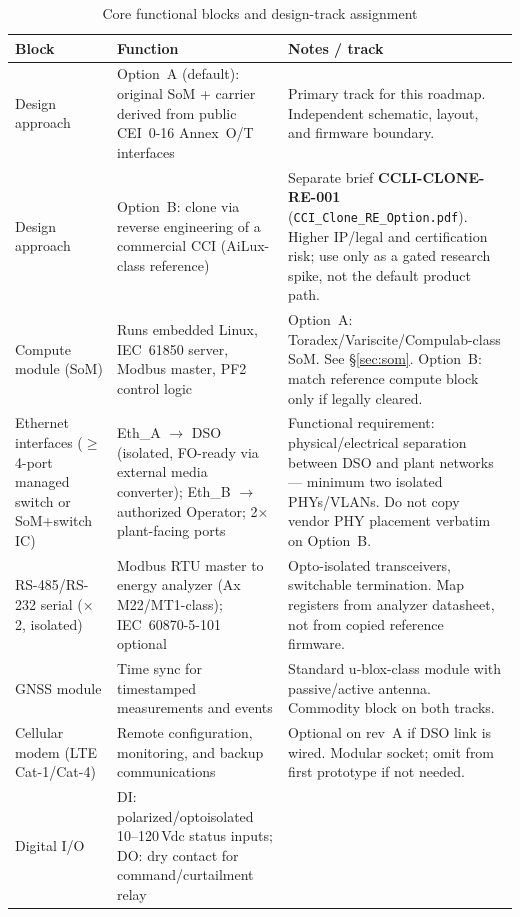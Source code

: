 \documentclass[11pt,a4paper]{article}
\newcommand{\file}[1]{\texttt{#1}}
\newcommand{\docref}[1]{\textbf{#1}}
\begin{document}
\begin{table}[htbp]
\centering
\caption{Core functional blocks and design-track assignment}
\label{tab:core-blocks}
\renewcommand{\arraystretch}{1.15}
\small
\begin{tabularx}{\linewidth}{@{}>{\raggedright\arraybackslash}p{2.65cm}>{\raggedright\arraybackslash}p{5.4cm}>{\RaggedRight\arraybackslash}X@{}}
\toprule
\textbf{Block} & \textbf{Function} & \textbf{Notes / track} \\
\midrule
Design approach &
Option~A (default): original SoM + carrier derived from public CEI~0-16 Annex~O/T interfaces &
Primary track for this roadmap. Independent schematic, layout, and firmware boundary. \\
\addlinespace
Design approach &
Option~B: clone via reverse engineering of a commercial CCI (AiLux-class reference) &
Separate brief \docref{CCLI-CLONE-RE-001} (\file{CCI\_Clone\_RE\_Option.pdf}). Higher IP/legal and certification risk; use only as a gated research spike, not the default product path. \\
\midrule
Compute module (SoM) &
Runs embedded Linux, IEC~61850 server, Modbus master, PF2 control logic &
Option~A: Toradex/Variscite/Compulab-class SoM. See \S\ref{sec:som}. Option~B: match reference compute block only if legally cleared. \\
Ethernet interfaces ($\geq$4-port managed switch or SoM+switch IC) &
Eth\_A $\rightarrow$ DSO (isolated, FO-ready via external media converter); Eth\_B $\rightarrow$ authorized Operator; 2$\times$ plant-facing ports &
Functional requirement: physical/electrical separation between DSO and plant networks --- minimum two isolated PHYs/VLANs. Do not copy vendor PHY placement verbatim on Option~B. \\
RS-485/RS-232 serial ($\times$2, isolated) &
Modbus RTU master to energy analyzer (Ax M22/MT1-class); IEC~60870-5-101 optional &
Opto-isolated transceivers, switchable termination. Map registers from analyzer datasheet, not from copied reference firmware. \\
GNSS module &
Time sync for timestamped measurements and events &
Standard u-blox-class module with passive/active antenna. Commodity block on both tracks. \\
Cellular modem (LTE Cat-1/Cat-4) &
Remote configuration, monitoring, and backup communications &
Optional on rev~A if DSO link is wired. Modular socket; omit from first prototype if not needed. \\
Digital I/O &
DI: polarized/optoisolated 10--120\,Vdc status inputs; DO: dry contact for command/curtailment relay &

\end{tabularx}
\end{table}
\end{document}
